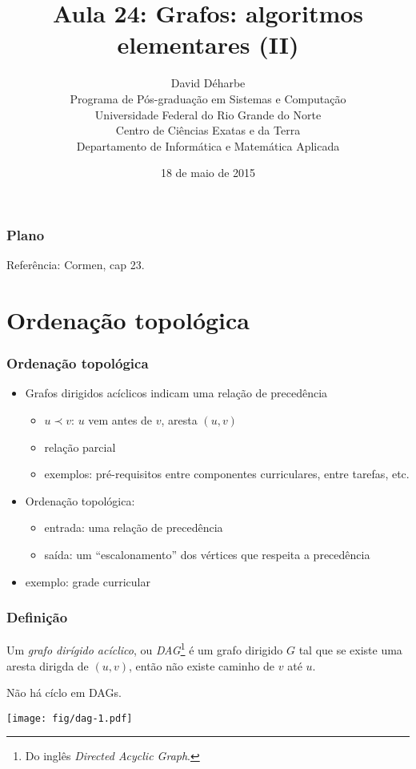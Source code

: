 \documentclass{beamer}
\title{Aula 24: Grafos: algoritmos elementares (II)}
\author{David Déharbe \\
  Programa de Pós-graduação em Sistemas e Computação \\
  Universidade Federal do Rio Grande do Norte \\
  Centro de Ciências Exatas e da Terra \\
  Departamento de Informática e Matemática Aplicada}
\date{18 de maio de 2015}
\begin{document}

\begin{frame}
  \titlepage
\end{frame}

\begin{frame}
  \frametitle{Plano}
  \tableofcontents

Referência: Cormen, cap 23.
\end{frame}

\section{Ordenação topológica}

\begin{frame}
\frametitle{Ordenação topológica}

\begin{itemize}
\item Grafos dirigidos acíclicos indicam uma relação de precedência
\begin{itemize}
\item $u \prec v$: $u$ vem antes de $v$, aresta $(u, v)$
\item relação parcial
\item exemplos: pré-requisitos entre componentes curriculares, entre tarefas, etc.
\end{itemize}
\item Ordenação topológica:
\begin{itemize}
\item entrada: uma relação de precedência
\item saída: um ``escalonamento'' dos vértices que respeita a precedência
\end{itemize}
\item exemplo: grade curricular
\end{itemize}
\end{frame}

\begin{frame}
\frametitle{Definição}

\begin{definition}
Um \emph{grafo dirígido acíclico}, ou \emph{DAG}\footnote{Do inglês \textit{Directed Acyclic Graph}.}  é um grafo dirigido $G$ tal que se existe uma aresta dirigda de $(u, v)$, então não existe caminho de $v$ até $u$.
\end{definition}

Não há cíclo em DAGs.

\begin{center}
\texttt{[image: fig/dag-1.pdf]}
\end{center}

\end{frame}
\end{document}
